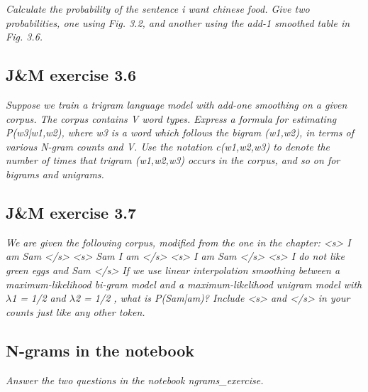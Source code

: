 \documentclass[a4paper, 11pt]{article}
\begin{document}
\textit{Calculate the probability of the sentence i want chinese food. Give two probabilities, one using Fig. 3.2, and another using the add-1 smoothed table in Fig. 3.6.}

\subsection{J\&M exercise 3.6}

\textit{Suppose we train a trigram language model with add-one smoothing on a given corpus. The corpus contains V word types. Express a formula for estimating P(w3|w1,w2), where w3 is a word which follows the bigram (w1,w2), in terms of various N-gram counts and V. Use the notation c(w1,w2,w3) to denote the number of times that trigram (w1,w2,w3) occurs in the corpus, and so on for bigrams and unigrams.}

\subsection{J\&M exercise 3.7}

\textit{We are given the following corpus, modified from the one in the chapter:
<s> I am Sam </s>
<s> Sam I am </s>
<s> I am Sam </s>
<s> I do not  like green eggs and Sam </s>
If we use linear interpolation smoothing between a maximum-likelihood bi-gram model and a maximum-likelihood unigram model with $\lambda$1 = 1/2 and $\lambda$2 = 1/2 , what is P(Sam|am)? Include <s> and </s> in your counts just like any other token.}

\subsection{N-grams in the notebook}

\textit{Answer the two questions in the notebook ngrams\_exercise.}
\end{document}
